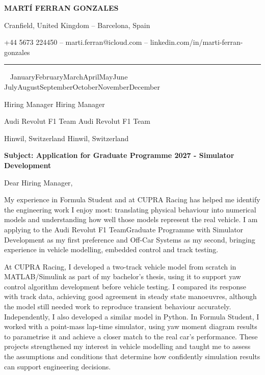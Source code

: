 \documentclass[a4paper,11pt]{article}
\newcommand{\letterdate}{%
  \number\day\ \ifcase\month\or
  January\or February\or March\or April\or May\or June\or
  July\or August\or September\or October\or November\or December\fi
  \ \number\year}
\newcommand{\recipientname}{Hiring Manager}
\newcommand{\company}{Audi Revolut F1 Team}
\newcommand{\companycity}{Hinwil, Switzerland}
\newcommand{\rolename}{Graduate Programme 2027 - Simulator Development}
\newcommand{\letterline}[1]{%
  \edef\letterlinetmp{#1}%
  \ifx\letterlinetmp\empty\else
    \letterlinetmp\par
  \fi
}
\begin{document}
{\centering
\textbf{\Huge MARTÍ FERRAN GONZALES}\par
\vspace{1pt}
{\fontsize{10}{12}\selectfont
Cranfield, United Kingdom -- Barcelona, Spain\par
\vspace{1pt}
+44 5673 224450 -- marti.ferran@icloud.com -- linkedin.com/in/marti-ferran-gonzales\par
}
\vspace{4pt}
}
\nointerlineskip
\rule{\textwidth}{0.4pt}\par
\vspace{10pt}
\nointerlineskip

\letterdate\par
\vspace{18pt}
\nointerlineskip
\letterline{\recipientname}
\letterline{\company}
\letterline{\companycity}
\vspace{10pt}
\nointerlineskip
\textbf{Subject: Application for \rolename}\par
\vspace{10pt}
\nointerlineskip
Dear \recipientname,\par
\setlength{\parskip}{8pt}

My experience in Formula Student and at CUPRA Racing has helped me identify the engineering work I enjoy most: translating physical behaviour into numerical models and understanding how well those models represent the real vehicle. I am applying to the \company\hspace{1mm}Graduate Programme with Simulator Development as my first preference and Off-Car Systems as my second, bringing experience in vehicle modelling, embedded control and track testing.

At CUPRA Racing, I developed a two-track vehicle model from scratch in MATLAB/Simulink as part of my bachelor’s thesis, using it to support yaw control algorithm development before vehicle testing. I compared its response with track data, achieving good agreement in steady state manoeuvres, although the model still needed work to reproduce transient behaviour accurately. Independently, I also developed a similar model in Python. In Formula Student, I worked with a point-mass lap-time simulator, using yaw moment diagram results to parametrise it and achieve a closer match to the real car’s performance. These projects strengthened my interest in vehicle modelling and taught me to assess the assumptions and conditions that determine how confidently simulation results can support engineering decisions.
\end{document}
